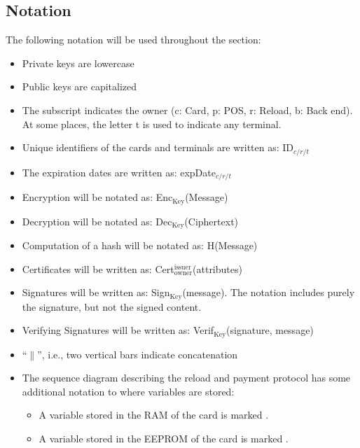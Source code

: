 \documentclass{article}
\begin{document}
\subsection{Notation} \label{sec:notation}
The following notation will be used throughout the section:
\begin{itemize}
    \item Private keys are lowercase
    
    \item Public keys are capitalized
    
    \item The subscript indicates the owner (c: Card, p: POS, r: Reload, b: Back end).
    At some places, the letter t is used to indicate any terminal.

    \item Unique identifiers of the cards and terminals are written as: ID$_{c/r/t}$

    \item The expiration dates are written as: expDate$_{c/r/t}$

    \item Encryption will be notated as: Enc$_{\textrm{Key}}$(Message)

    \item Decryption will be notated as: Dec$_{\textrm{Key}}$(Ciphertext)
    
    \item Computation of a hash will be notated as: H(Message)
    
    \item Certificates will be written as: Cert$_\textrm{owner}^\textrm{issuer}$(attributes)

    \item Signatures will be written as: Sign$_{\textrm{Key}}$(message).
    The notation includes purely the signature, but not the signed content.

    \item Verifying Signatures will be written as: Verif$_{\textrm{Key}}$(signature, message)

    \item ``$\|$'', i.e., two vertical bars indicate concatenation

    \item The sequence diagram describing the reload and payment protocol has some additional notation to where variables are stored:
    \begin{itemize}
        \item A variable stored in the RAM of the card is marked .
        \item A variable stored in the EEPROM of the card is marked .
    \end{itemize}
\end{itemize}
\end{document}
